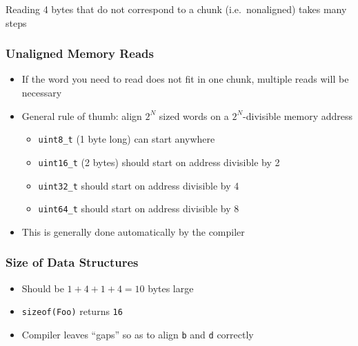 \begin{frame}
\begin{center}
  \end{center}
  \begin{center}
    Reading 4 bytes that do not correspond to a chunk (i.e.~nonaligned) takes many steps
  \end{center}
\end{frame}

\begin{frame}
  \frametitle{Unaligned Memory Reads}
  \begin{itemize}
    \item If the word you need to read does not fit in one chunk, multiple reads will be necessary
    \item General rule of thumb: align $2^N$ sized words on a $2^N$-divisible memory address
          \begin{itemize}
            \item \texttt{uint8\_t} (1 byte long) can start anywhere
            \item \texttt{uint16\_t} (2 bytes) should start on address divisible by 2
            \item \texttt{uint32\_t} should start on address divisible by 4
            \item \texttt{uint64\_t} should start on address divisible by 8
          \end{itemize}
    \item This is generally done automatically by the compiler
  \end{itemize}
\end{frame}

\begin{frame}
  \frametitle{Size of Data Structures}
  \begin{itemize}
    \item Should be $1+4+1+4 = 10$ bytes large
    \item \texttt{sizeof(Foo)} returns \texttt{16}
    \item Compiler leaves ``gaps'' so as to align \texttt{b} and \texttt{d} correctly
  \end{itemize}
\end{frame}

